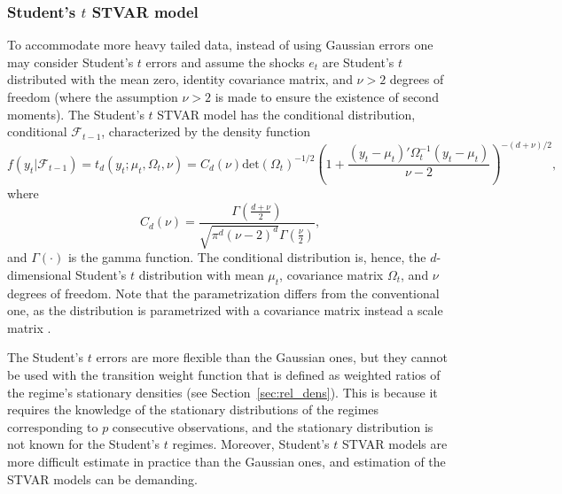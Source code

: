 \documentclass[nojss]{jss}
\begin{document}
\subsubsection{Student's $t$ STVAR model}
To accommodate more heavy tailed data, instead of using Gaussian errors one may consider Student's $t$ errors and assume the shocks $e_t$ are Student's $t$ distributed with the mean zero, identity covariance matrix, and $\nu>2$ degrees of freedom (where the assumption $\nu>2$ is made to ensure the existence of second moments). The Student's $t$ STVAR model has the conditional distribution, conditional $\mathcal{F}_{t-1}$, characterized by the density function
\begin{equation}
f(y_t|\mathcal{F}_{t-1}) = t_d(y_t;\mu_t,\Omega_t,\nu)=C_d(\nu)\text{det}(\Omega_t)^{-1/2}\left(1+\frac{(y_t -\mu_t)'\Omega_t^{-1}(y_t - \mu_t)}{\nu-2}\right)^{-(d+\nu)/2},
\end{equation}
where
\begin{equation}
C_d(\nu)=\frac{\Gamma\left(\frac{d+\nu}{2}\right)}{\sqrt{\pi^d(\nu-2)^d}\Gamma\left(\frac{\nu}{2}\right)},
\end{equation}
and $\Gamma\left(\cdot\right)$ is the gamma function. The conditional distribution is, hence, the $d$-dimensional Student's $t$ distribution with mean $\mu_t$, covariance matrix $\Omega_t$, and $\nu$ degrees of freedom. Note that the parametrization differs from the conventional one, as the distribution is parametrized with a covariance matrix instead a scale matrix \cite[see, e.g.,][Appendix~A for details about the parametrization]{Meitz+Preve+Saikkonen:2023}.

The Student's $t$ errors are more flexible than the Gaussian ones, but they cannot be used with the transition weight function that is defined as weighted ratios of the regime's stationary densities (see Section~\ref{sec:rel_dens}). This is because it requires the knowledge of the stationary distributions of the regimes corresponding to $p$ consecutive observations, and the stationary distribution is not known for the Student's $t$ regimes. Moreover, Student's $t$ STVAR models are more difficult estimate in practice than the Gaussian ones, and estimation of the STVAR models can be demanding.
\end{document}
